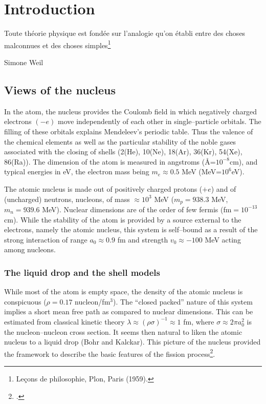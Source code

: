 	\chapter{Introduction}\label{introduction}
	 \epigraph{Toute th\'eorie physique est fond\'ee sur l'analogie qu'on \'etabli entre des choses malconnues et des choses simples\footnote{Le\c{c}ons de philosophie, Plon, Paris (1959).}}{Simone Weil}
\section{Views of the nucleus}
In the atom, the nucleus provides the Coulomb field in which negatively charged electrons $(-e)$ move independently of each other in single--particle orbitals. The filling of these orbitals explains Mendeleev's periodic table. Thus the valence of the chemical elements as well as the particular stability of the noble gases associated with the closing of shells (2(He), 10(Ne), 18(Ar), 36(Kr), 54(Xe), 86(Ra)). The dimension of the atom is measured in angstroms (\AA=$10^{-8}$cm), and typical energies in eV, the electron mass being $m_e\approx 0.5$ MeV (MeV=$10^6$eV).


The atomic nucleus is made out of positively charged protons ($+e$) and of (uncharged) neutrons, nucleons, of mass $\approx 10^3$ MeV ($m_p=938.3$ MeV, $m_n=939.6$ MeV). Nuclear dimensions are of the order of few fermis (fm$=10^{-13}$ cm). While the stability of the atom is provided by a source external to the electrons, namely the atomic nucleus, this system is  self--bound as a result of the strong interaction of range $a_0\approx 0.9$ fm and strength $v_0\approx -100$ MeV acting among nucleons. 
\subsection{The liquid drop and the shell models}\label{S1.1.1}
While most of the atom is empty space, the density of the atomic nucleus is conspicuous ($\rho=0.17$ nucleon/fm$^3$). The ``closed packed'' nature of this system implies a short mean free path as compared to nuclear dimensions. This can be estimated from classical kinetic theory $\lambda\approx(\rho\sigma)^{-1}\approx1$ fm, where $\sigma\approx 2\pi a_0^2$ is the nucleon--nucleon cross section. It seems then natural to liken the atomic nucleus to a liquid drop (Bohr and Kalckar).
This picture of the nucleus provided the framework to describe the basic features of the fission process\footnote{\cite{Meitner:39,Bohr:39}.}. 



